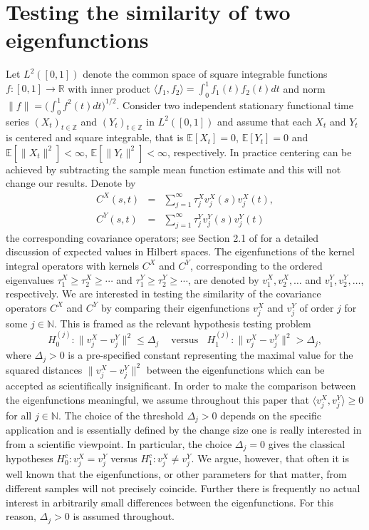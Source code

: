 \documentclass[11pt]{article}
\numberwithin{equation}{section}
\numberwithin{theorem}{section}
\numberwithin{lemma}{section}
\numberwithin{proposition}{section}
\numberwithin{cor}{section}
\numberwithin{definition}{section}
\numberwithin{cons}{section}
\numberwithin{rem}{section}
\numberwithin{exa}{section}
\numberwithin{table}{section}
\numberwithin{figure}{section}
\numberwithin{algo}{section}
\begin{document}
{{\section{Testing the similarity of two eigenfunctions  }
\label{sec2}
\def\theequation{2.\arabic{equation}}
\setcounter{equation}{0}
Let $L^{2}([0,1])$ denote the common space of square integrable functions $f\colon[0,1] \to  \mathbb{R} $ with  inner  product $\langle f_{1}, f_{2}\rangle =  \int_{0}^1 f_{1}(t)f_{2}(t) dt$ and norm $\| f\| = \big (  \int_{0}^1 f^{2}(t)dt  \big)^{1/2}$.
Consider  two independent stationary functional time series  $(X_t)_{t \in \mathbb{Z}}$ and  $(Y_t)_{t \in \mathbb{Z}}$  in $L^2([0,1])$ and assume that  each $X_t$  and $Y_{t}$ is centered and square integrable, that is $\mathbb{E}[X_t]=0$, $\mathbb{E}[Y_t]=0$ and $\mathbb{E}[ \|X_t\|^{2}] < \infty $, $\mathbb{E}[ \|Y_t\|^{2}] < \infty $, respectively. In practice centering can be achieved by subtracting the sample mean function estimate
and this will not change our results. Denote by
\begin{eqnarray}\label{1.1}
  C^X (s,t) &=& \sum^\infty_{j=1} \tau^X_j v^X_j(s) v^X_j(t), \\ \label{1.2}
  C^Y (s,t) &=& \sum^\infty_{j=1} \tau^Y_j v^Y_j(s) v^Y_j(t)
\end{eqnarray}
the corresponding  covariance operators; see Section 2.1 of \cite{buecher2018} for a detailed discussion of expected values in Hilbert spaces.
The eigenfunctions of the kernel integral operators with kernels $C^X$ and $C^Y$, corresponding to the ordered eigenvalues  $\tau^X_1 \geq  \tau^X_2 \geq  \cdots $ and $\tau^Y_1 \geq     \tau^Y_2 \geq   \cdots $, are denoted by $ v^X_1, v^X_2, \ldots$ and $ v^Y_1, v^Y_2, \ldots$, respectively.
We are interested in testing the similarity of the  covariance operators $C^X$ and $C^Y$ by comparing their eigenfunctions $ v^X_j$ and $ v^Y_j$ of order $j$ for some $j \in \mathbb{N}$. This is framed as the relevant hypothesis testing problem
  \begin{equation}\label{2.21:func}
    H^{(j)}_0 \colon \| v^X_j - v^Y_j  \|^2 \leq \Delta_j
    ~~~~\mbox{ versus} ~~~~
    H^{(j)}_1 \colon\| v^X_j - v^Y_j  \|^2 > \Delta_j ,
  \end{equation}
 where $\Delta_j >0 $ is a pre-specified constant representing the maximal value for the squared distances $\| v^X_j - v^Y_j  \|^2$ between the eigenfunctions which can be accepted as scientifically insignificant.
  In order to make the comparison between the eigenfunctions meaningful, we assume throughout this paper  that $\langle v^X_{j}, v^Y_{j} \rangle \geq 0$ for all $j \in \mathbb{N}$.
The choice of the  threshold  $\Delta_j >0 $ depends on the specific application and is essentially defined by the change size one is really interested in from a scientific viewpoint.
In particular, the choice $\Delta_j =0$ gives the classical hypotheses $H^{c}_{0}\colon  v^X_j =v^Y_j$ versus  $H^{c}_{1}\colon  v^X_j  \not =v^Y_j$.
We argue, however, that often it is well known that the eigenfunctions, or other parameters for that matter, from different samples will not precisely coincide. Further there is frequently no actual interest in arbitrarily small differences between the eigenfunctions. For this reason, $\Delta_{j}>0$ is assumed throughout.

}}
\end{document}
